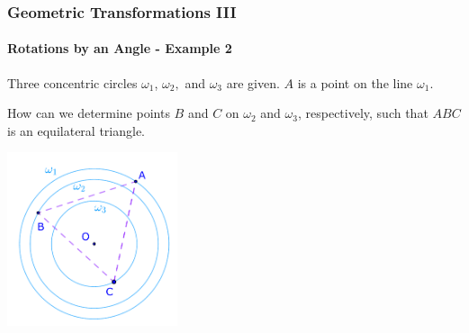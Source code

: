 \documentclass[8pt,xcolor=table,dvipsnames]{beamer}
\begin{document}
\begin{frame}[t]
    \frametitle{Geometric Transformations III}
    \framesubtitle{Rotations by an Angle - Example 2}
    \begin{example}
        Three concentric circles $\omega_1$, $\omega_2,$ and $\omega_3$ are given. $A$ is a point on the line $\omega_1$.
        
        \bigbreak
        How can we determine points $B$ and $C$ on $\omega_2$ and $\omega_3$, respectively, such that $ABC$ is an equilateral triangle.
    \end{example}

    \begin{center}
        \includegraphics[width=5cm]{./svg/pdf/rotation-5a.pdf}
    \end{center}
\end{frame}
\end{document}
